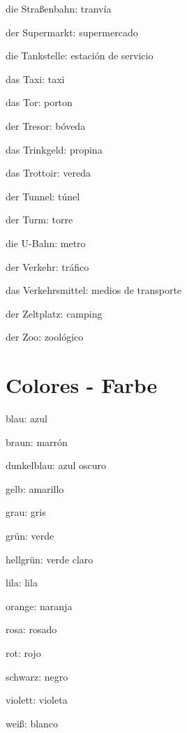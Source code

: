 \begin{multicols}{2}
\begin{myitemize}
\item die Straßenbahn: tranvía
\item der Supermarkt: supermercado
\item die Tankstelle: estación de servicio
\item das Taxi: taxi
\item das Tor: porton
\item der Tresor: bóveda
\item das Trinkgeld: propina
\item das Trottoir: vereda
\item der Tunnel: túnel
\item der Turm: torre
\item die U-Bahn: metro
\item der Verkehr: tráfico
\item das Verkehrsmittel: medios de transporte
\item der Zeltplatz: camping
\item der Zoo: zoológico
\end{myitemize}
\end{multicols}


\section{Colores - Farbe}
\begin{multicols}{3}
\begin{myitemize}
\item blau: azul
\item braun: marrón
\item dunkelblau: azul oscuro
\item gelb: amarillo
\item grau: gris
\item grün: verde
\item hellgrün: verde claro
\item lila: lila
\item orange: naranja
\item rosa: rosado
\item rot: rojo
\item schwarz: negro
\item violett: violeta
\item weiß: blanco
\end{myitemize}
\end{multicols}

